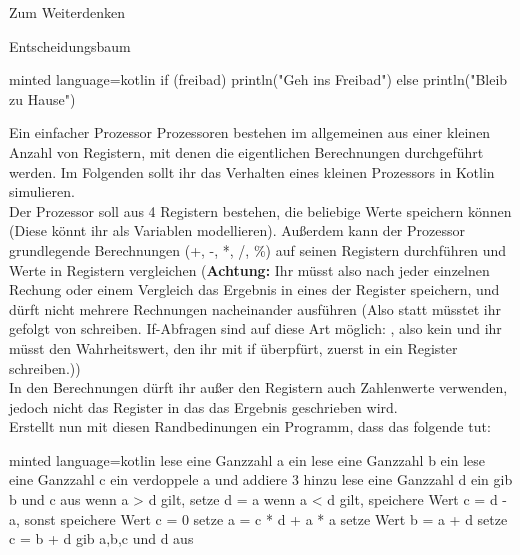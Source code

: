 \begin{task}[points=auto]{Zum Weiterdenken }
\begin{subtask*}[points=0]{Entscheidungsbaum}
\begin{solution}
\begin{codeBlock}[]{minted language=kotlin}
                if (freibad) {
                    println("Geh ins Freibad")
                } else {
                    println("Bleib zu Hause")
                }
            \end{codeBlock}
        \end{solution}
    \end{subtask*}
    \begin{subtask*}[points=0]{Ein einfacher Prozessor}
        Prozessoren bestehen im allgemeinen aus einer kleinen Anzahl von Registern, mit denen die eigentlichen Berechnungen durchgeführt werden. Im Folgenden sollt ihr das Verhalten eines kleinen Prozessors in Kotlin simulieren. \\
        Der Prozessor soll aus 4 Registern bestehen, die beliebige Werte speichern können (Diese könnt ihr als Variablen modellieren). Außerdem kann der Prozessor grundlegende Berechnungen ({\ttfamily +, -, *, /, \%}) auf seinen Registern durchführen und Werte in Registern vergleichen (\textbf{Achtung:} Ihr müsst also nach jeder einzelnen Rechung oder einem Vergleich das Ergebnis in eines der Register speichern, und dürft nicht mehrere Rechnungen nacheinander ausführen (Also statt  müsstet ihr  gefolgt von  schreiben. If-Abfragen sind auf diese Art möglich: , also kein  und ihr müsst den Wahrheitswert, den ihr mit if überpfürt, zuerst in ein Register schreiben.)) \\
        In den Berechnungen dürft ihr außer den Registern auch Zahlenwerte verwenden, jedoch nicht das Register in das das Ergebnis geschrieben wird.\\
        Erstellt nun mit diesen Randbedinungen ein Programm, dass das folgende tut: \\
        \begin{codeBlock}[]{minted language=kotlin}
            lese eine Ganzzahl a ein
            lese eine Ganzzahl b ein
            lese eine Ganzzahl c ein
            verdoppele a und addiere 3 hinzu
            lese eine Ganzzahl d ein
            gib b und c aus
            wenn a > d gilt, setze d = a
            wenn a < d gilt, speichere Wert c = d - a, sonst speichere Wert c = 0
            setze a = c * d + a * a
            setze Wert b = a + d
            setze c = b + d
            gib a,b,c und d aus
        \end{codeBlock}


\end{subtask*}
\end{task}
